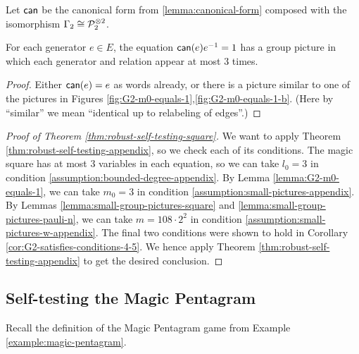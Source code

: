 Let $\operatorname*{\mathsf{can}}$ be the canonical form from \ref{lemma:canonical-form} composed with the isomorphism $\Gamma_2 \cong \mathcal{P}_2^{\otimes 2}$.
\begin{lemma}\label{lemma:G2-m0-equals-1}
	For each generator $e\in E$, the equation $\operatorname*{\mathsf{can}}(e)e^{-1} = 1$ has a group picture in which each generator and relation appear at most $3$ times. 
\end{lemma}
\begin{proof}

	Either $\operatorname*{\mathsf{can}}(e) = e$ as words already, or there is a picture similar to one of the pictures in Figures \ref{fig:G2-m0-equals-1},\ref{fig:G2-m0-equals-1-b}. (Here by ``similar'' we mean ``identical up to relabeling of edges''.) 
\end{proof}


\begin{proof}[Proof of Theorem \ref{thm:robust-self-testing-square}]
We want to apply Theorem \ref{thm:robust-self-testing-appendix}, so we check each of its conditions. The magic square has at most $3$ variables in each equation, so we can take $l_0 = 3$ in condition \eqref{assumption:bounded-degree-appendix}. By Lemma \ref{lemma:G2-m0-equals-1}, we can take $m_0 = 3$ in condition \eqref{assumption:small-pictures-appendix}. By Lemmas \ref{lemma:small-group-pictures-square} and \ref{lemma:small-group-pictures-pauli-n}, we can take $m = 108\cdot 2^2$  in condition \eqref{assumption:small-pictures-w-appendix}. The final two conditions were shown to hold in Corollary \ref{cor:G2-satisfies-conditions-4-5}. We hence apply Theorem \ref{thm:robust-self-testing-appendix} to get the desired conclusion.
\end{proof}

\subsection{Self-testing the Magic Pentagram}
Recall the definition of the Magic Pentagram game from Example \ref{example:magic-pentagram}. 

